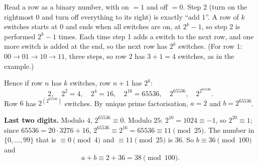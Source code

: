 Read a row as a binary number, with on $=1$ and off $=0$. Step 2 (turn on the rightmost $0$ and turn off everything to its right) is exactly ``add $1$''. A row of $k$ switches starts at $0$ and ends when all switches are on, at $2^k-1$, so step 2 is performed $2^k-1$ times. Each time step 1 adds a switch to the next row, and one more switch is added at the end, so the next row has $2^k$ switches. (For row $1$: $00\to01\to10\to11$, three steps, so row $2$ has $3+1=4$ switches, as in the example.)

Hence if row $n$ has $k$ switches, row $n+1$ has $2^k$:
\[2,\quad 2^2=4,\quad 2^4=16,\quad 2^{16}=65536,\quad 2^{65536},\quad 2^{2^{65536}}.\]
Row $6$ has $2^{\left(2^{65536}\right)}$ switches. By unique prime factorisation, $a=2$ and $b=2^{65536}$.

\textbf{Last two digits.} Modulo $4$, $2^{65536}\equiv0$. Modulo $25$: $2^{10}=1024\equiv-1$, so $2^{20}\equiv1$; since $65536=20\cdot3276+16$, $2^{65536}\equiv2^{16}=65536\equiv11\pmod{25}$. The number in $\{0,\dots,99\}$ that is $\equiv0\pmod4$ and $\equiv11\pmod{25}$ is $36$. So $b\equiv36\pmod{100}$ and
\[a+b\equiv2+36=\boxed{38}\pmod{100}.\]
